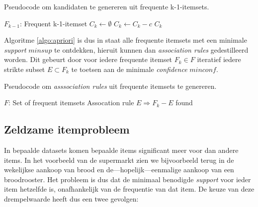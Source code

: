 \begin{algorithm}
\caption{Pseudocode om kandidaten te genereren uit frequente k-1-itemsets.}
\label{algo:candidateGen}
\begin{algorithmic} 
\Require $F_{k-1}$: Frequent k-1-itemset
    \State $C_k \gets \emptyset$
            	\State $C_k \gets C_k - c$ 
            \EndIf
        \EndFor
    \EndFor
    \State \Return $C_k$ 
\EndFunction
\end{algorithmic}
\end{algorithm}
%
Algoritme \ref{algo:apriori} is dus in staat alle frequente itemsets met een minimale \emph{support} $minsup$ te ontdekken, hieruit kunnen dan \emph{association rules} gedestilleerd worden. Dit gebeurt door voor iedere frequente itemset $F_k \in F$ iteratief iedere strikte subset $E \subset F_k$ te toetsen aan de minimale \emph{confidence} $minconf$.
%
\begin{algorithm}
\caption{Pseudocode om \emph{asssociation rules} uit frequente itemsets te genereren.}
\label{algo:step_2}
\begin{algorithmic} 
\Require $F$: Set of frequent itemsets
            	\State Assocation rule $E \Rightarrow F_k - E $ found
            \EndIf
        \EndFor
    \EndFor
\EndFunction
\end{algorithmic}
\end{algorithm}
%
\subsection{Zeldzame itemprobleem}
In bepaalde datasets komen bepaalde items significant meer voor dan andere items. In het voorbeeld van de supermarkt zien we bijvoorbeeld terug in de wekelijkse aankoop van brood en de---hopelijk---eenmalige aankoop van een broodrooster. Het probleem is dus dat de minimaal benodigde \emph{support} voor ieder item hetzelfde is, onafhankelijk van de frequentie van dat item. De keuze van deze drempelwaarde heeft dus een twee gevolgen:

